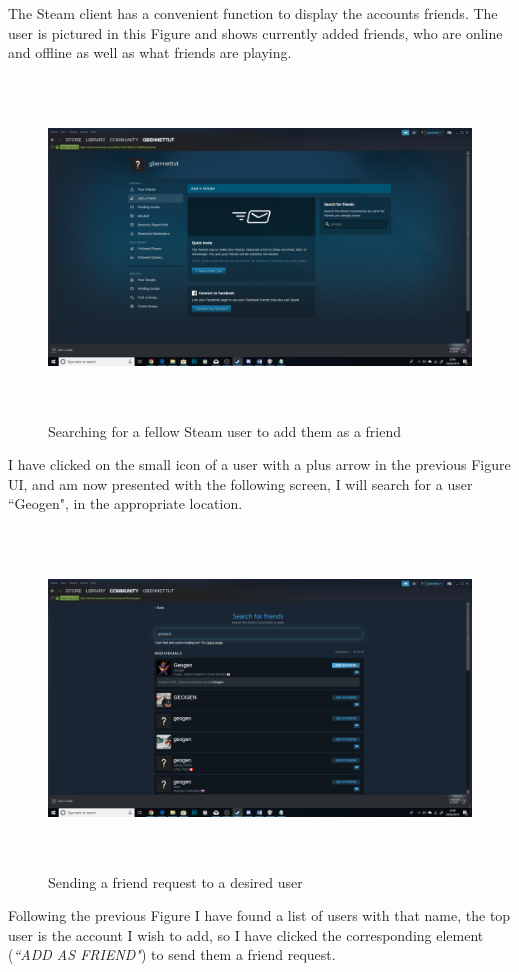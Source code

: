 The Steam client has a convenient function to display the accounts friends. The user is pictured in this Figure and shows currently added friends, who are online and offline as well as what friends are playing.

\begin{figure}[H]
\includegraphics[width=16cm,height=9cm]{Screenshots/SteamScreenShots/searchforAFriend.png}
\caption{Searching for a fellow Steam user to add them as a friend}    
\end{figure}

I have clicked on the small icon of a user with a plus arrow in the previous Figure UI, and am now presented with the following screen, I will search for a user ``Geogen", in the appropriate location.

\begin{figure}[H]
\includegraphics[width=16cm,height=9cm]{Screenshots/SteamScreenShots/friendRequestSent.png}
\caption{Sending a friend request to a desired user}    
\end{figure}

Following the previous Figure I have found a list of users with that name, the top user is the account I wish to add, so I have clicked the corresponding element (\textit{``ADD AS FRIEND"}) to send them a friend request.

